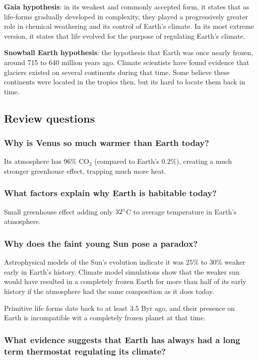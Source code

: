 \textbf{Gaia hypothesis}: in its weakest and commonly accepted form, it states
that as life-forms gradually developed in complexity, they played a
progressively greater role in chemical weathering and its control of Earth's
climate. In its most extreme version, it states that life evolved for the
purpose of regulating Earth's climate.

\textbf{Snowball Earth hypothesis}: the hypothesis that Earth was once nearly
frozen, around 715 to 640 million years ago. Climate scientists have found
evidence that glaciers existed on several continents during that time. Some
believe these continents were located in the tropics then, but its hard to
locate them back in time.

\subsection{Review questions}

\subsubsection{Why is Venus so much warmer than Earth today?}
Its atmosphere has 96\% CO$_2$ (compared to Earth's $0.2\%$), creating
a much stronger greenhouse effect, trapping much more heat.

\subsubsection{What factors explain why Earth is habitable today?}
Small greenhouse effect adding only $32 \degree$C to average temperature
in Earth's atmosphere.

\subsubsection{Why does the faint young Sun pose a paradox?}
Astrophysical models of the Sun's evolution indicate it was $25\%$ to $30\%$
weaker early in Earth's history. Climate model simulations show that the
weaker sun would have resulted in a completely frozen Earth for more than half
of its early history if the atmosphere had the same composition as it does
today.

Primitive life forms date back to at least 3.5 Byr ago, and their presence on
Earth is incompatible wit a completely frozen planet at that time.

\subsubsection{What evidence suggests that Earth has always had a long term
thermostat regulating its climate?}

